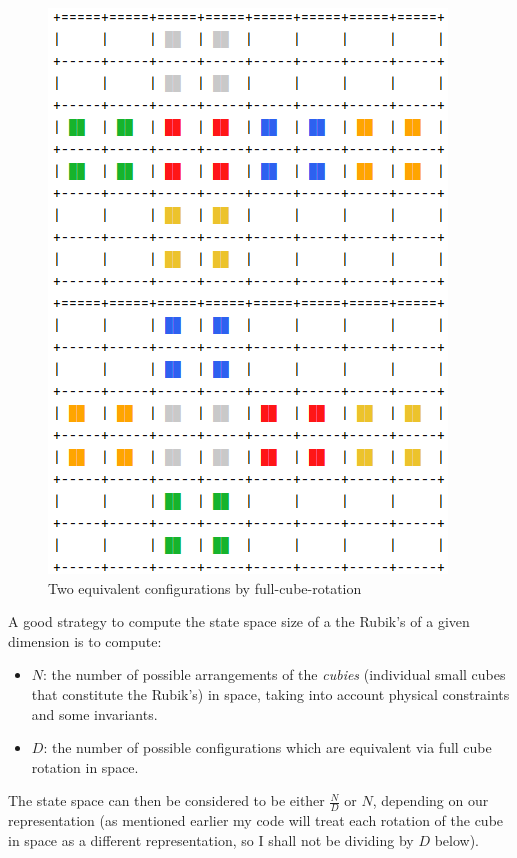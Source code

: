 \begin{figure}[H]
\centering
\includegraphics[scale=0.4]{./Figures/equivalentcubes}
\caption[Reducing RC]{Two equivalent configurations by full-cube-rotation}
\label{fig:configurations}
\end{figure}




A good strategy to compute the state space size of a the Rubik's of a given dimension is to compute:
\begin{itemize}
\item $N$: the number of possible arrangements of the \textit{cubies} (individual small cubes that constitute the Rubik's) in space, taking into account physical constraints and some invariants.
\item $D$: the number of possible configurations which are equivalent via full cube rotation in space.
\end{itemize}
The state space can then be considered to be either $\frac{N}{D}$ or $N$, depending on our representation (as mentioned earlier my code will treat each rotation of the cube in space as a different representation, so I shall not be dividing by $D$ below).

